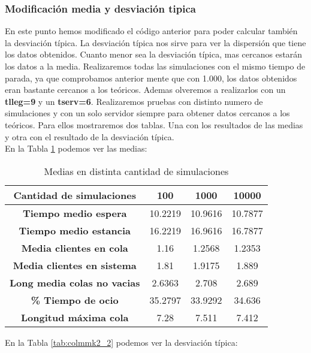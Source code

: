 \documentclass[12pt,a4paper]{article}
\begin{document}
\subsubsection{Modificación media y desviación tipica}
En este punto hemos modificado el código anterior para poder calcular también la desviación típica. La desviación típica nos sirve para ver la dispersión que tiene los datos obtenidos. Cuanto menor sea la desviación típica, mas cercanos estarán los datos a la media. Realizaremos todas las simulaciones con el mismo tiempo de parada, ya que comprobamos anterior mente que con 1.000, los datos obtenidos eran bastante cercanos a los teóricos. Ademas olveremos a realizarlos con un \textbf{tlleg=9} y un \textbf{tserv=6}. Realizaremos pruebas con distinto numero de simulaciones y con un solo servidor siempre para obtener datos cercanos a los teóricos. Para ellos mostraremos dos tablas. Una con los resultados de las medias y otra con el resultado de la desviación típica.\\
En la Tabla \ref{tab:colmmk2} podemos ver las medias:
\begin{table}[H]
	\centering	
	\begin{tabular}{c|ccc} \toprule
		Cantidad de simulaciones&100 & 1000 & 10000   \\ \midrule
		\textbf{Tiempo medio espera}   		& 10.2219  & 10.9616 &  10.7877\\
		\textbf{Tiempo medio estancia} 		& 16.2219  & 16.9616 & 16.7877 \\
		\textbf{Media clientes en cola}		& 1.16 & 1.2568 & 1.2353\\		\midrule
		\textbf{Media clientes en sistema} 	& 1.81 & 1.9175 & 1.889 \\
		\textbf{Long media colas no vacias} & 2.6363 & 2.708 & 2.689 \\
		\textbf{\% Tiempo de ocio}  		& 35.2797 & 33.9292 & 34.636 \\		
		\textbf{Longitud máxima cola}  		& 7.28 & 7.511 & 7.412 \\
		\midrule		
	\end{tabular}
	\caption{Medias en distinta cantidad de simulaciones} \label{tab:colmmk2}
\end{table}
En la Tabla \ref{tab:colmmk2_2} podemos ver la desviación típica:
\end{document}
